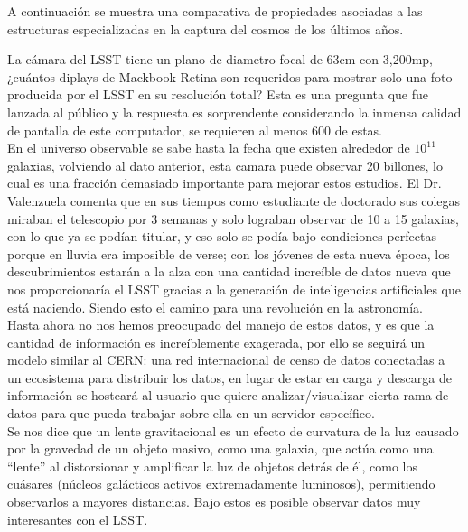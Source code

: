 \documentclass{article}
\begin{document}
A continuación se muestra una comparativa de propiedades asociadas a las estructuras especializadas en la captura del cosmos de los últimos años.

La cámara del LSST tiene un plano de diametro focal de 63cm con 3,200mp, ¿cuántos diplays de Mackbook Retina son requeridos para mostrar solo una foto producida por el LSST en su resolución total? Esta es una pregunta que fue lanzada al público y la respuesta es sorprendente considerando la inmensa calidad de pantalla de este computador, se requieren al menos 600 de estas.\\

En el universo observable se sabe hasta la fecha que existen alrededor de $10^11$ galaxias, volviendo al dato anterior, esta camara puede observar 20 billones, lo cual es una fracción demasiado importante para mejorar estos estudios.
El Dr. Valenzuela comenta que en sus tiempos como estudiante de doctorado sus colegas miraban el telescopio por 3 semanas y solo lograban observar de 10 a 15 galaxias, con lo que ya se podían titular, y eso solo se podía bajo condiciones perfectas porque en lluvia era imposible de verse; con los jóvenes de esta nueva época, los descubrimientos estarán a la alza con una cantidad increíble de datos nueva que nos proporcionaría el LSST gracias a la generación de inteligencias artificiales que está naciendo. Siendo esto el camino para una revolución en la astronomía.\\

Hasta ahora no nos hemos preocupado del manejo de estos datos, y es que la cantidad de información es increíblemente exagerada, por ello se seguirá un modelo similar al CERN: una red internacional de censo de datos conectadas a un ecosistema para distribuir los datos, en lugar de estar en carga y descarga de información se hosteará al usuario que quiere analizar/visualizar cierta rama de datos para que pueda trabajar sobre ella en un servidor específico.\\

Se nos dice que un lente gravitacional es un efecto de curvatura de la luz causado por la gravedad de un objeto masivo, como una galaxia, que actúa como una “lente” al distorsionar y amplificar la luz de objetos detrás de él, como los cuásares (núcleos galácticos activos extremadamente luminosos), permitiendo observarlos a mayores distancias. Bajo estos es posible observar datos muy interesantes con el LSST.\\
\end{document}
